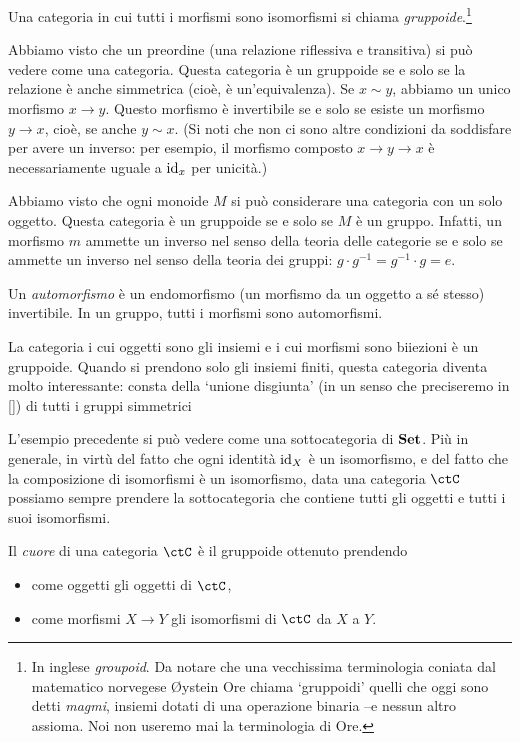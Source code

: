 \begin{definition}[Gruppoide]\label{def_gruppoide}
	Una categoria in cui tutti i morfismi sono isomorfismi si chiama \emph{gruppoide}.\footnote{In inglese \emph{groupoid}. Da notare che una vecchissima terminologia coniata dal matematico norvegese Øystein Ore chiama `gruppoidi' quelli che oggi sono detti \emph{magmi}, insiemi dotati di una operazione binaria --e nessun altro assioma. Noi non useremo mai la terminologia di Ore.}
\end{definition}
\begin{example}\label{exa_releq_groupoid}
	Abbiamo visto che un preordine (una relazione riflessiva e transitiva) si può vedere come una categoria. Questa categoria è un gruppoide se e solo se la relazione è anche simmetrica (cioè, è un'equivalenza). Se \(x\sim y\), abbiamo un unico morfismo \(x\to y\). Questo morfismo è invertibile se e solo se esiste un morfismo \(y\to x\), cioè, se anche \(y\sim x\). (Si noti che non ci sono altre condizioni da soddisfare per avere un inverso: per esempio, il morfismo composto \(x\to y\to x\) è necessariamente uguale a \(\mathrm{id}_x\) per unicità.)
\end{example}
\begin{example}\label{exa_grp_groupoid}
	Abbiamo visto che ogni monoide \(M\) si può considerare una categoria con un solo oggetto. Questa categoria è un gruppoide se e solo se \(M\) è un gruppo. Infatti, un morfismo \(m\) ammette un inverso nel senso della teoria delle categorie se e solo se ammette un inverso nel senso della teoria dei gruppi: \(g\cdot g^{-1}=g^{-1}\cdot g = e\).
\end{example}

Un \emph{automorfismo} è un endomorfismo (un morfismo da un oggetto a sé stesso) invertibile. In un gruppo, tutti i morfismi sono automorfismi.

\begin{example}
	La categoria i cui oggetti sono gli insiemi e i cui morfismi sono biiezioni è un gruppoide. Quando si prendono solo gli insiemi finiti, questa categoria diventa molto interessante: consta della `unione disgiunta' (in un senso che preciseremo in \ref{}) di tutti i gruppi simmetrici\Todo{}
\end{example}

L'esempio precedente si può vedere come una sottocategoria di \(\mathbf{Set}\).
Più in generale, in virtù del fatto che ogni identità \(\mathrm{id}_X\) è un isomorfismo, e del fatto che la composizione di isomorfismi è un isomorfismo, data una categoria \(\ctC\) possiamo sempre prendere la sottocategoria che contiene tutti gli oggetti e tutti i suoi isomorfismi.
\begin{definition}
	Il \emph{cuore} di una categoria \(\ctC\) è il gruppoide ottenuto prendendo
	\begin{itemize}
		\item come oggetti gli oggetti di \(\ctC\),
		\item come morfismi \(X\to Y\) gli isomorfismi di \(\ctC\) da \(X\) a \(Y\).
	\end{itemize}
\end{definition}

